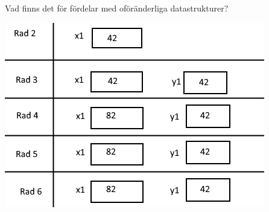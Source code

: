 \Subtask\Pen Vad finns det för fördelar med oföränderliga datastrukturer?


\SOLUTION


\TaskSolved \what
 

\SubtaskSolved   \includegraphics[scale=0.5]{../img/w04-solutions/uppgift-13a}


